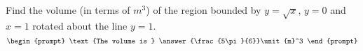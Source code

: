 \documentclass{ximera}
\author{Gregory Hartman \and Matthew Carr}
\begin{document}
\begin{exercise}






Find the volume (in terms of $\unit{m}^3$) of the region bounded by $y=\sqrt{x}$, $y=0$ and $x=1$ rotated about the line $y=1$.
\[
\begin{prompt}
\text{The volume is } \answer{\frac{5\pi}{6}}\unit{m}^3
\end{prompt}
\]




\end{exercise}
\end{document}
